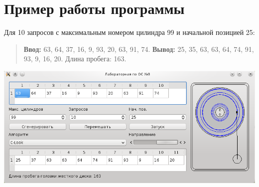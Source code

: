 \documentclass[a4paper,10pt,oneside]{article}
\begin{document}
\section{Пример работы программы}
Для 10 запросов с максимальным номером цилиндра 99 и начальной позицией 25:

\begin{quote}
\begin{flushleft}
\textbf{Ввод:} 63, 64, 37, 16, 9, 93, 20, 63, 91, 74.\linebreak
\textbf{Вывод:} 25, 35, 63, 63, 64, 74, 91, 93, 9, 16, 20.\linebreak
Длина пробега: 163.
\end{flushleft}
\end{quote}

\includegraphics[width=150mm]{ioshed.png}
\end{document}
